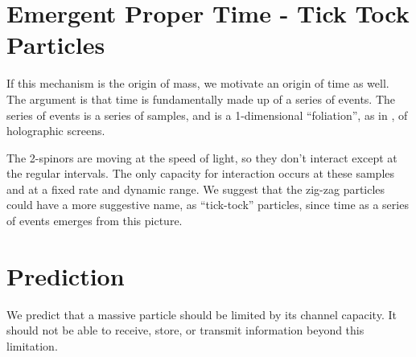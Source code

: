 \documentclass[12pt,a4paper]{article}
\begin{document}
\section{Emergent Proper Time - Tick Tock Particles}
If this mechanism is the origin of mass, we motivate an origin of time as well.  The argument is that time is fundamentally made up of a series of events. The series of events is a series of samples, and is a 1-dimensional ``foliation'', as in \cite{entropic}, of holographic screens. 

The 2-spinors are moving at the speed of light, so they don't interact except at the regular intervals. The only capacity for interaction occurs at these samples and at a fixed rate and dynamic range.  We suggest that the zig-zag particles could have a more suggestive name, as ``tick-tock'' particles, since time as a series of events emerges from this picture.

\section{Prediction}
We predict that a massive particle should be limited by its channel capacity.  It should not be able to receive, store, or transmit information beyond this limitation.



\end{document}
